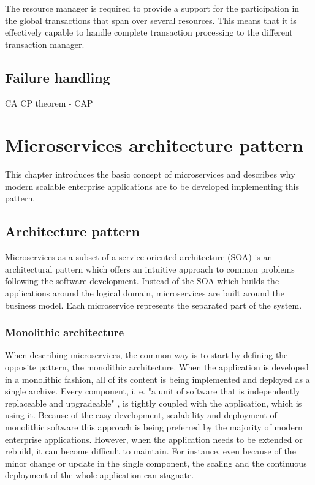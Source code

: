 \documentclass[oneside,
  digital, %
  table,   %
  nolof,     %
  nolot,     %
]{fithesis3}
\begin{document}
The resource manager is required to provide a support for the participation in the global transactions that span over several resources. This means that it is effectively capable to handle complete transaction processing to the different transaction manager.

\section{Failure handling}





CA CP theorem - CAP




\chapter{Microservices architecture pattern}

This chapter introduces the basic concept of microservices and describes why modern scalable enterprise applications are to be developed implementing this pattern.

\section{Architecture pattern}

Microservices as a subset of a service oriented architecture (SOA) \cite{soa} is an architectural pattern which offers an intuitive approach to common problems following the software development. Instead of the SOA which builds the applications around the logical domain, microservices are built around the business model. Each microservice represents the separated part of the system.

\subsection{Monolithic architecture}

When describing microservices, the common way is to start by defining the opposite pattern, the monolithic architecture. When the application is developed in a monolithic fashion, all of its content is being implemented and deployed as a single archive. Every component, i. e. "a unit of software that is independently replaceable and upgradeable" \cite{microservices}, is tightly coupled with the application, which is using it. Because of the easy development, scalability and deployment of monolithic software this approach is being preferred by the majority of modern enterprise applications. However, when the application needs to be extended or rebuild, it can become difficult to maintain. For instance, even because of the minor change or update in the single component, the scaling and the continuous deployment of the whole application can stagnate. 
\end{document}
